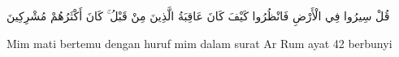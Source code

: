 \item
\begin{center}
{\arabic  قُلْ سِيرُوا فِي الْأَرْضِ فَانْظُرُوا كَيْفَ كَانَ عَاقِبَةُ الَّذِينَ مِنْ قَبْلُ ۚ كَانَ أَكْثَرُهُمْ مُشْرِكِينَ } \par
\end{center}
Mim mati bertemu dengan huruf mim dalam  surat Ar Rum ayat 42 berbunyi

